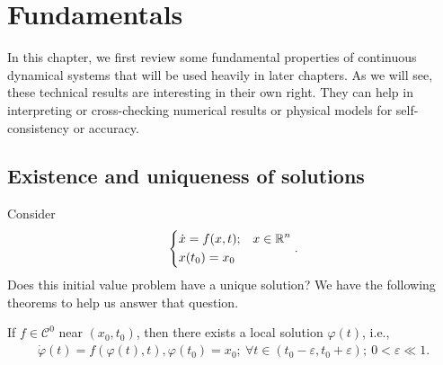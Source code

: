\chapter{Fundamentals}
 In this chapter, we first review some fundamental properties of continuous dynamical systems that will be used heavily in later chapters. As we will see, these technical results are interesting in their own right. They can help in interpreting or cross-checking numerical results or physical models for self-consistency or accuracy.
\section{Existence and uniqueness of solutions}
Consider  
\begin{align}
\begin{dcases}
	\dot{ {x}} = f( {x},t); &  {x} \in \mathbb{R}^{n} \\
	 {x}(t_0) =  {x}_0
\end{dcases}.
\end{align}
Does this initial value problem have a unique solution? We have the following theorems to help us answer that question.
\begin{theorem}[Peano]
	\label{thm:Peano}
	If $f\in \mathcal{C}^0$ near $( {x}_0, t_0)$, then there exists a local solution $\varphi(t)$, i.e., 
\begin{align}
	\dot{\varphi}(t) = f(\varphi(t), t), \varphi(t_0) = x_0;\ \forall  t\in (t_0 - \varepsilon, t_0 + \varepsilon);\ 0<  \varepsilon \ll 1.
\end{align}
\end{theorem}
